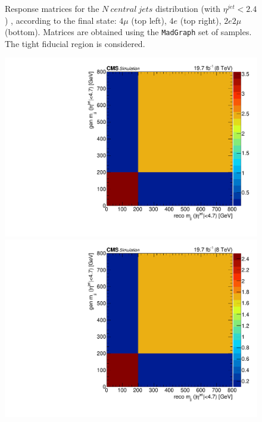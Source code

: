 \begin{figure}[hbtp]
\begin{center}
    \caption{Response matrices for the $N\ central\ jets$ distribution (with $\eta^{jet}<2.4$) , according to the final state:  $4\mu$ (top left), $4e$ (top right), $2e2\mu$  (bottom). Matrices are obtained using the  \texttt{MadGraph} set of samples. The tight fiducial region is considered.} 
    \label{fig:CentralJets_matrices}
  \end{center}
\end{figure}
\begin{figure}[hbtp]
  \begin{center}
    \includegraphics[width=\cmsFigWidth]{Figures/ResMat_qqggJJ_Mjj_ZZTo4m_st_01_fr_Mad}
    \includegraphics[width=\cmsFigWidth]{Figures/ResMat_qqggJJ_Mjj_ZZTo4e_st_01_fr_Mad}

\end{center}
\end{figure}
